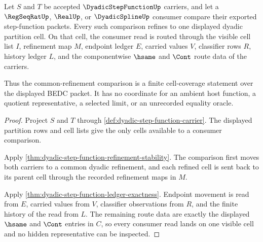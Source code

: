 \begin{theorem}
\label{thm:dyadic-step-function-common-refinement-cell-coverage}
Let $S$ and $T$ be accepted $\DyadicStepFunctionUp$ carriers, and let a $\RegSeqRatUp$, $\RealUp$, or $\DyadicSplineUp$ consumer compare their exported step-function packets. Every such comparison refines to one displayed dyadic partition cell. On that cell, the consumer read is routed through the visible cell list $I$, refinement map $M$, endpoint ledger $E$, carried values $V$, classifier rows $R$, history ledger $L$, and the componentwise $\hsame$ and $\Cont$ route data of the carriers.

Thus the common-refinement comparison is a finite cell-coverage statement over the displayed BEDC packet. It has no coordinate for an ambient host function, a quotient representative, a selected limit, or an unrecorded equality oracle.
\end{theorem}
\begin{proof}
Project $S$ and $T$ through \autoref{def:dyadic-step-function-carrier}. The displayed partition rows and cell lists give the only cells available to a consumer comparison.

Apply \autoref{thm:dyadic-step-function-refinement-stability}. The comparison first moves both carriers to a common dyadic refinement, and each refined cell is sent back to its parent cell through the recorded refinement maps in $M$.

Apply \autoref{thm:dyadic-step-function-ledger-exactness}. Endpoint movement is read from $E$, carried values from $V$, classifier observations from $R$, and the finite history of the read from $L$. The remaining route data are exactly the displayed $\hsame$ and $\Cont$ entries in $C$, so every consumer read lands on one visible cell and no hidden representative can be inspected.
\end{proof}

